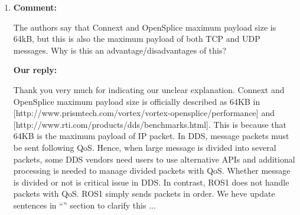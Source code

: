 \documentclass{article}
\begin{document}
\begin{enumerate}
  \begin{flushleft}
    \textbf{Our reply:}
  \end{flushleft}
  Thank you very much for your thoughtful suggestion.
  We have additionally conducted evaluation of a multiple destinations publisher for increased network load in ``3.3.4 Multiple Destinations Publisher local cases'' section.
  This evaluation provides insight for the overhead of DDS scales as shown in \ref{fig:ospl_multi} and \ref{fig:ospl_multi_128K}.
  However, we did not conduct further evaluationso for real-time guarantees with constrained or unreliable network because QoS Policies supposed by ROS2 are insufficient for real-time processing.
  We will conduct these evaluations with configuring QoS variables for real-time systems.
  We have explicitly described this fact as futur work.
  \begin{itembox}[|]{Updated sentences about future work in ``5. CONCLUSION'' section}
    Since ROS2 is under development, we must maximize DDS potential by tuning and abstracting more \emph{QoS Policies} for real-time processing and DDS configurations.
  \end{itembox}\\
  \begin{itembox}[|]{Updated sentences about future work in ``5. CONCLUSION'' section}
    In future work, we will evaluate real-time applications such as an autonomous driving vehicle \cite{kato2015open}, \cite{saito2014fusion}, as case studies using ROS2. 
  \end{itembox}\\


\item \begin{flushleft}
  \textbf{Comment:}
\end{flushleft}
  The authors say that Connext and OpenSplice maximum payload size is 64kB, but this is also the maximum payload of both TCP and UDP messages. Why is this an advantage/disadvantages of this?

  \begin{flushleft}
    \textbf{Our reply:}
  \end{flushleft}
  Thank you very much for indicating our unclear explanation.
  Connext and OpenSplice maximum payload size is officially described as 64KB in [http://www.prismtech.com/vortex/vortex-opensplice/performance] and [http://www.rti.com/products/dds/benchmarks.html].
  This is because that 64KB is the maximum payload of IP packet.
  In DDS, message packets must be sent following QoS.
  Hence, when large message is divided into several packets, some DDS vendors need users to use alternative APIs and additional processing is needed to manage divided packets with QoS.
  Whether message is divided or not is critical issue in DDS.
  In contrast, ROS1 does not handle packets with QoS.
  ROS1 simply sends packets in order.
  We heve update sentences in ``'' section to clarify this ...


\end{enumerate}
\end{document}
